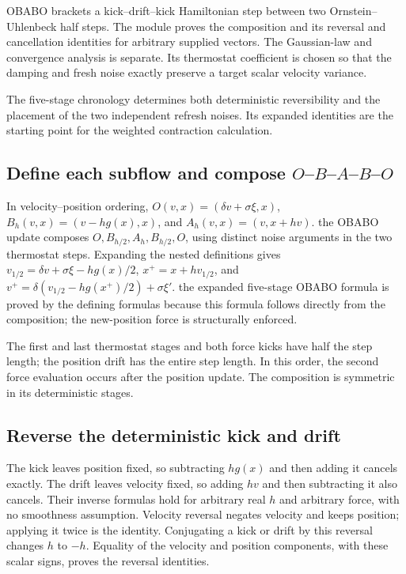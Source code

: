 \documentclass[11pt,a4paper]{report}
\begin{document}
OBABO brackets a kick–drift–kick Hamiltonian step between two Ornstein–Uhlenbeck half steps. The module proves the composition and its reversal and cancellation identities for arbitrary supplied vectors. The Gaussian-law and convergence analysis is separate. Its thermostat coefficient is chosen so that the damping and fresh noise exactly preserve a target scalar velocity variance.



The five-stage chronology determines both deterministic reversibility and the placement of the two independent refresh noises. Its expanded identities are the starting point for the weighted contraction calculation.

\subsection{\texorpdfstring{Define each subflow and compose \(O\)–\(B\)–\(A\)–\(B\)–\(O\)}{Define each subflow and compose O–B–A–B–O}}
\label{report-step-KineticLangevin-OBABO-lean-1}


In velocity–position ordering, \(O(v,x)=(\delta v+\sigma\xi,x)\), \(B_h(v,x)=(v-hg(x),x)\), and \(A_h(v,x)=(v,x+hv)\). the OBABO update composes \(O,B_{h/2},A_h,B_{h/2},O\), using distinct noise arguments in the two thermostat steps. Expanding the nested definitions gives \(v_{1/2}=\delta v+\sigma\xi-hg(x)/2\), \(x^+=x+hv_{1/2}\), and \(v^+=\delta(v_{1/2}-hg(x^+)/2)+\sigma\xi'\). the expanded five-stage OBABO formula is proved by the defining formulas because this formula follows directly from the composition; the new-position force is structurally enforced.



The first and last thermostat stages and both force kicks have half the step length; the position drift has the entire step length. In this order, the second force evaluation occurs after the position update. The composition is symmetric in its deterministic stages.

\subsection{\texorpdfstring{Reverse the deterministic kick and drift}{Reverse the deterministic kick and drift}}
\label{report-step-KineticLangevin-OBABO-lean-2}


The kick leaves position fixed, so subtracting \(hg(x)\) and then adding it cancels exactly. The drift leaves velocity fixed, so adding \(hv\) and then subtracting it also cancels. Their inverse formulas hold for arbitrary real \(h\) and arbitrary force, with no smoothness assumption. Velocity reversal negates velocity and keeps position; applying it twice is the identity. Conjugating a kick or drift by this reversal changes \(h\) to \(-h\). Equality of the velocity and position components, with these scalar signs, proves the reversal identities.
\end{document}
